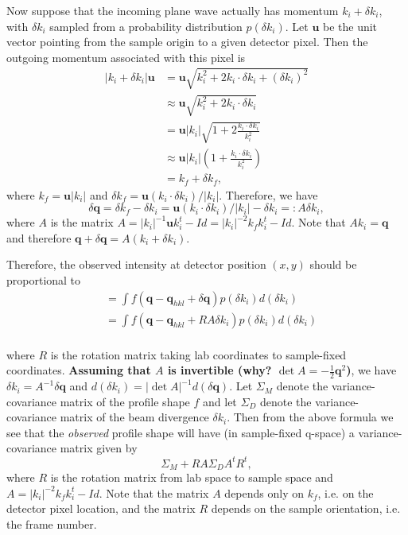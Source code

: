 \documentclass[twocolumn,preprintnumbers,amsmath,amssymb]{revtex4}
\newcommand{\bq}{\mathbf{q}}
\newcommand{\bu}{\mathbf{u}}
\begin{document}
Now suppose that the incoming plane wave actually has momentum $k_i + \delta k_i$, with $\delta k_i$ sampled from a probability distribution $p(\delta k_i)$. Let $\bu$ be the unit vector pointing from the sample origin to a given detector pixel. Then the outgoing momentum associated with this pixel is
\begin{align}
  |k_i + \delta k_i| \bu &= \bu \sqrt{k_i^2  + 2 k_i \cdot \delta k_i + (\delta k_i)^2 } \\
  &\approx \bu\sqrt{k_i^2  + 2 k_i \cdot \delta k_i} \\
  &= \bu|k_i|\sqrt{1+ 2\frac{k_i \cdot \delta k_i}{k_i^2}} \\
  &\approx \bu|k_i| \left(1 +  \frac{k_i \cdot \delta k_i}{k_i^2}\right) \\
  &= k_f + \delta k_f,
\end{align}
where $k_f = \bu|k_i|$ and $\delta k_f = \bu(k_i \cdot \delta k_i) / |k_i|$. Therefore, we have
\begin{equation} \delta\bq = \delta k_f - \delta k_i = \bu(k_i \cdot \delta k_i) / |k_i| - \delta k_i =: A \delta k_i, \end{equation}
where $A$ is the matrix $A = |k_i|^{-1} \bu k_i^t - Id = |k_i|^{-2} k_f k_i^t - Id$. Note that $A k_i = \bq$ and therefore
$\bq + \delta \bq = A(k_i + \delta k_i)$.

Therefore, the observed intensity at detector position $(x,y)$ should be proportional to
\begin{align}
  &= \int f(\bq - \bq_{hkl} + \delta \bq) p(\delta k_i) d(\delta k_i) \\
  &= \int f(\bq - \bq_{hkl} + RA \delta k_i) p(\delta k_i) d(\delta k_i) \\
\end{align}

where $R$ is the rotation matrix taking lab coordinates to sample-fixed coordinates.
\textbf{Assuming that $A$ is invertible (why? $\det A = -\frac{1}{2}\bq^2$)}, we have $\delta k_i = A^{-1} \delta \bq$ and $d(\delta k_i) = |\det A|^{-1} d(\delta \bq)$. Let $\Sigma_M$ denote the variance-covariance matrix of the profile shape $f$ and let $\Sigma_D$ denote the variance-covariance matrix of the beam divergence $\delta k_i$. Then from the above formula we see that the \emph{observed} profile shape will have (in sample-fixed q-space) a variance-covariance matrix given by
\begin{equation} \Sigma_M + R A \Sigma_D A^t R^t, \end{equation}
where $R$ is the rotation matrix from lab space to sample space and $A = |k_i|^{-2} k_f k_i^t - Id$.
Note that the matrix $A$ depends only on $k_f$, i.e. on the detector pixel location, and the matrix $R$ depends on the sample orientation, i.e. the frame number.
\end{document}
